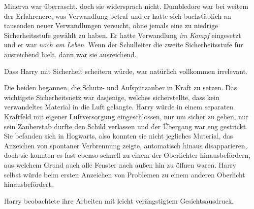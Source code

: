 Minerva war überrascht, doch sie widersprach nicht. Dumbledore war bei weitem der Erfahrenere, was Verwandlung betraf und er hatte sich buchstäblich an tausenden neuer Verwandlungen versucht, ohne jemals eine zu niedrige Sicherheitsstufe gewählt zu haben. Er hatte Verwandlung \emph{im Kampf} eingesetzt und er war \emph{noch am Leben.} Wenn der Schulleiter die zweite Sicherheitsstufe für ausreichend hielt, dann war sie ausreichend.

Dass Harry mit Sicherheit scheitern würde, war natürlich vollkommen irrelevant.

Die beiden begannen, die Schutz- und Aufspürzauber in Kraft zu setzen. Das wichtigste Sicherheitsnetz war dasjenige, welches sicherstellte, dass kein verwandeltes Material in die Luft gelangte. Harry würde in einem separaten Kraftfeld mit eigener Luftversorgung eingeschlossen, nur um sicher zu gehen, nur sein Zauberstab durfte den Schild verlassen und der Übergang war eng gestrickt. Sie befanden sich in Hogwarts, also konnten sie nicht jegliches Material, das Anzeichen von spontaner Verbrennung zeigte, automatisch hinaus disapparieren, doch sie konnten es fast ebenso schnell zu einem der Oberlichter hinausbefördern, aus welchem Grund auch alle Fenster nach außen hin zu öffnen waren. Harry selbst würde beim ersten Anzeichen von Problemen zu einem anderen Oberlicht hinausbefördert.

Harry beobachtete ihre Arbeiten mit leicht verängstigtem Gesichtsausdruck.

